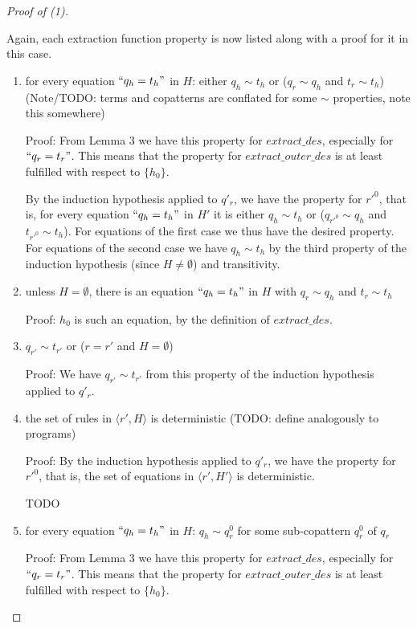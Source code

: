 \documentclass[11pt]{article} %
\begin{document}
\begin{proof}[Proof of (1)]
\begin{enumerate}
\begin{itemize}
Again, each extraction function property is now listed along with a proof for it in this case.

\begin{enumerate}

\item for every equation $`` q_h = t_h "$ in $H$: either $q_h \sim t_h$ or ($q_r \sim q_h$ and $t_r \sim t_h$) (Note/TODO: terms and copatterns are conflated for some $\sim$ properties, note this somewhere)

Proof: From Lemma 3 we have this property for $extract\_des$, especially for $`` q_r = t_r "$. This means that the property for $extract\_outer\_des$ is at least fulfilled with respect to $\{h_0\}$.

By the induction hypothesis applied to $q'_r$, we have the property for $r'^0$, that is, for every equation $`` q_h = t_h "$ in $H'$ it is either $q_h \sim t_h$ or ($q_{r'^0} \sim q_h$ and $t_{r'^0} \sim t_h$). For equations of the first case we thus have the desired property. For equations of the second case we have $q_h \sim t_h$ by the third property of the induction hypothesis (since $H \neq \emptyset$) and transitivity.

\item unless $H = \emptyset$, there is an equation $`` q_h = t_h "$ in $H$ with $q_r \sim q_h$ and $t_r \sim t_h$

Proof: $h_0$ is such an equation, by the definition of $extract\_des$.

\item $q_{r'} \sim t_{r'}$ or ($r = r'$ and $H = \emptyset$)

Proof: We have $q_{r'} \sim t_{r'}$ from this property of the induction hypothesis applied to $q'_r$.

\item the set of rules in $\big\langle r', H \big\rangle$ is deterministic (TODO: define analogously to programs)

Proof: By the induction hypothesis applied to $q'_r$, we have the property for $r'^0$, that is, the set of equations in $\big\langle r', H' \big\rangle$ is deterministic.

TODO

\item for every equation $`` q_h = t_h "$ in $H$: $q_h \sim q^0_r$ for some sub-copattern $q^0_r$ of $q_r$

Proof: From Lemma 3 we have this property for $extract\_des$, especially for $`` q_r = t_r "$. This means that the property for $extract\_outer\_des$ is at least fulfilled with respect to $\{h_0\}$.


\end{enumerate}
\end{itemize}
\end{enumerate}
\end{proof}
\end{document}
